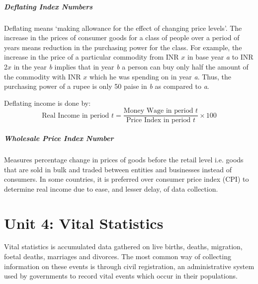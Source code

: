 \documentclass[
10pt, %
a4paper, %
]{report}
\begin{document}
\paragraph*{Deflating Index Numbers}
Deflating means ‘making allowance for the effect of changing price levels’. The increase in the prices of consumer goods for a class of people over a period of years means reduction in the purchasing power for the class. For example, the increase in the price of a particular commodity from INR \(x\) in base year \textit{a} to INR 2\(x\) in the year \textit{b} implies that in year \textit{b} a person can buy only half the amount of the commodity with INR \(x\) which he was spending on in year \textit{a}. Thus, the purchasing power of a rupee is only 50 paise in \textit{b} as compared to \textit{a}.

Deflating income is done by:
\[
\text{Real Income in period }t = \frac{\text{Money Wage in period }t}{\text{Price Index in period }t} \times 100
\]

\paragraph*{Wholesale Price Index Number}
Measures percentage change in prices of goods before the retail level i.e. goods that are sold in bulk and traded between entities and businesses instead of consumers. In some countries, it is preferred over consumer price index (CPI) to determine real income due to ease, and lesser delay, of data collection.

\chapter*{Unit 4: Vital Statistics}

Vital statistics is accumulated data gathered on live births, deaths, migration, foetal deaths, marriages and divorces. The most common way of collecting information on these events is through civil registration, an administrative system used by governments to record vital events which occur in their populations.
\end{document}
